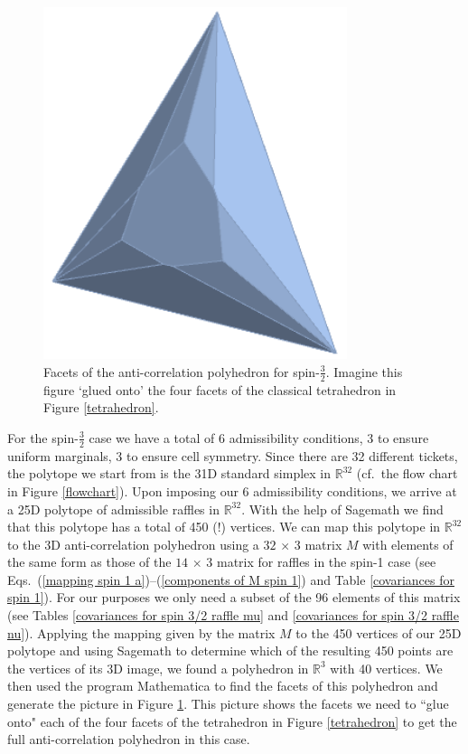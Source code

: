\begin{figure}[ht]
 \centering
   \includegraphics[width=3.5in]{SpinThreeHalfFace.png} 
   \caption{Facets of the anti-correlation polyhedron for spin-$\frac{3}{2}$. Imagine this figure `glued onto' the four facets of the classical tetrahedron in Figure \ref{tetrahedron}.}
   \label{SpinThreeHalfFace}
\end{figure}

For the spin-$\frac32$ case we have a total of 6 admissibility conditions, 3 to ensure uniform marginals, 3 to ensure cell symmetry. Since there are 32 different tickets, the polytope we start from is the 31D standard simplex in $\mathbb{R}^{32}$ (cf.\ the flow chart in Figure \ref{flowchart}). Upon imposing our 6 admissibility conditions, we arrive at a 25D polytope of admissible raffles in $\mathbb{R}^{32}$. With the help of Sagemath we find that this polytope has a total of 450 (!) vertices. We can map this polytope  in $\mathbb{R}^{32}$ to the 3D anti-correlation polyhedron using a $32 \, \times \, 3$ matrix $M$ with elements of the same form as those of the $14 \, \times \, 3$ matrix for raffles in the spin-1 case (see Eqs.\ (\ref{mapping spin 1 a})--(\ref{components of M spin 1}) and Table \ref{covariances for spin 1}). For our purposes we only need a subset of the 96 elements of this matrix (see Tables \ref{covariances for spin 3/2 raffle mu} and \ref{covariances for spin 3/2 raffle nu}). Applying the mapping given by the matrix $M$ to the 450 vertices of our 25D polytope and using Sagemath to determine which of the resulting 450 points are the vertices of its 3D image, we found a polyhedron in $\mathbb{R}^{3}$ with 40 vertices. We then used the program Mathematica to find the facets of this polyhedron and generate the picture in Figure \ref{SpinThreeHalfFace}. This picture shows the facets we need to ``glue onto" each of the four facets of the tetrahedron in Figure \ref{tetrahedron} to get the full anti-correlation polyhedron in this case.

